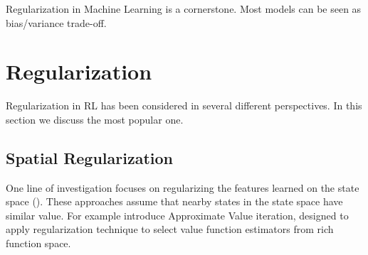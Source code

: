 Regularization in Machine Learning is a cornerstone. Most models can be seen as bias/variance trade-off.
\section{Regularization} %
Regularization in RL has been considered in several different perspectives. In this section we discuss the most popular one. 

\subsection{Spatial Regularization}
 One line of investigation focuses on regularizing the features learned on the state space (\cite{massoud2009regularized,petrik2010feature,pazis2011non,farahmand2011regularization,liu2012regularized,harrigan2016deep}). These approaches assume that nearby states in the state space have similar value. For example \cite{farahmand2011regularization} introduce Approximate Value iteration, designed to apply regularization technique to select value function estimators from rich function space.


